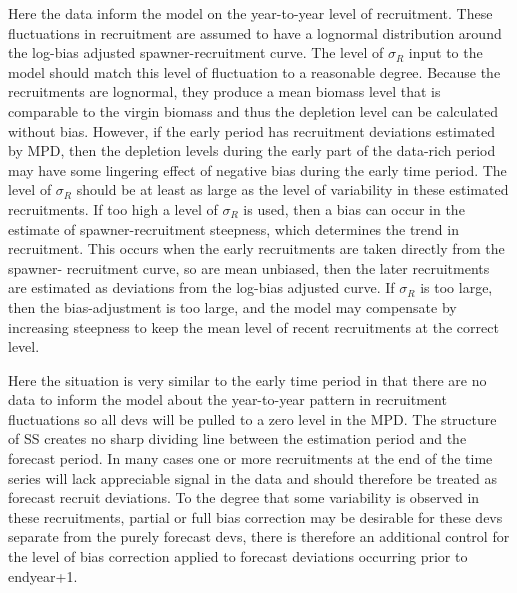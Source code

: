 Here the data inform the model on the year-to-year level of recruitment.  These fluctuations in recruitment are assumed to have a lognormal distribution around the log-bias adjusted spawner-recruitment curve.  The level of $\sigma_R$ input to the model should match this level of fluctuation to a reasonable degree.  Because the recruitments are lognormal, they produce a mean biomass level that is comparable to the virgin biomass and thus the depletion level can be calculated without bias.  However, if the early period has recruitment deviations estimated by MPD, then the depletion levels during the early part of the data-rich period may have some lingering effect of negative bias during the early time period. The level of $\sigma_R$ should be at least as large as the level of variability in these estimated recruitments.  If too high a level of $\sigma_R$ is used, then a bias can occur in the estimate of spawner-recruitment steepness, which determines the trend in recruitment.  This occurs when the early recruitments are taken directly from the spawner- recruitment curve, so are mean unbiased, then the later recruitments are estimated as deviations from the log-bias adjusted curve.  If $\sigma_R$ is too large, then the bias-adjustment is too large, and the model may compensate by increasing steepness to keep the mean level of recent recruitments at the correct level.

Here the situation is very similar to the early time period in that there are no data to inform the model about the year-to-year pattern in recruitment fluctuations so all devs will be pulled to a zero level in the MPD.  The structure of SS creates no sharp dividing line between the estimation period and the forecast period.  In many cases one or more recruitments at the end of the time series will lack appreciable signal in the data and should therefore be treated as forecast recruit deviations.  To the degree that some variability is observed in these recruitments, partial or full bias correction may be desirable for these devs separate from the purely forecast devs, there is therefore an additional control for the level of bias correction applied to forecast deviations occurring prior to endyear+1.

